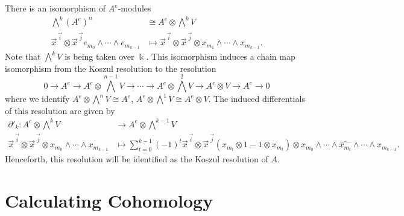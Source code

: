 \documentclass[12pt,a4paper]{article}
\newcommand{\kk}{\Bbbk}
\newcommand\1{_{(1)}}
\newcommand\2{_{(2)}}
\begin{document}
There is an isomorphism of $A^e$-modules 
\begin{align*}
\bigwedge^k\left(A^e\right)^n&\cong A^e\otimes\bigwedge^k V  \\
 \vec{x}^{\,\vec{i}}\otimes\vec{x}^{\,\vec{j}}e_{m_0}\wedge\cdots\wedge e_{m_{k-1}}&\mapsto \vec{x}^{\,\vec{i}}\otimes\vec{x}^{\,\vec{j}}\otimes x_{m_1}\wedge\cdots\wedge x_{m_{k-1}}.
\end{align*}
 Note that $\bigwedge^k V$ is being taken over $\kk$.
This isomorphism induces a chain map isomorphism from the Koszul resolution to the resolution
\[
0\to A^e\to A^e\otimes \bigwedge^{n-1}V\to\cdots\to A^e\otimes\bigwedge^2 V\to A^e\otimes V\to A^e\to 0  
\]
where we identify $A^e\otimes \bigwedge^n V\cong A^e$, $A^e\otimes\bigwedge^1 V\cong A^e\otimes V$.
The induced differentials of this resolution are given by
\begin{align*}
  \partial'_k:A^e\otimes\bigwedge^k V&\to A^e\otimes\bigwedge^{k-1}V\\
  \vec{x}^{\,\vec{i}}\otimes\vec{x}^{\,\vec{j}}\otimes x_{m_0}\wedge\cdots\wedge x_{m_{k-1}}&\mapsto \sum_{t=0}^{k-1}(-1)^t\vec{x}^{\,\vec{i}}\otimes\vec{x}^{\,\vec{j}}(x_{m_t}\otimes1-1\otimes x_{m_t})\otimes x_{m_0}\wedge\cdots\wedge\widehat{x_{m_t}}\wedge\cdots\wedge x_{m_{k-1}}.
\end{align*}
Henceforth, this resolution will be identified as the Koszul resolution of $A$.

\section{Calculating Cohomology}
\end{document}
